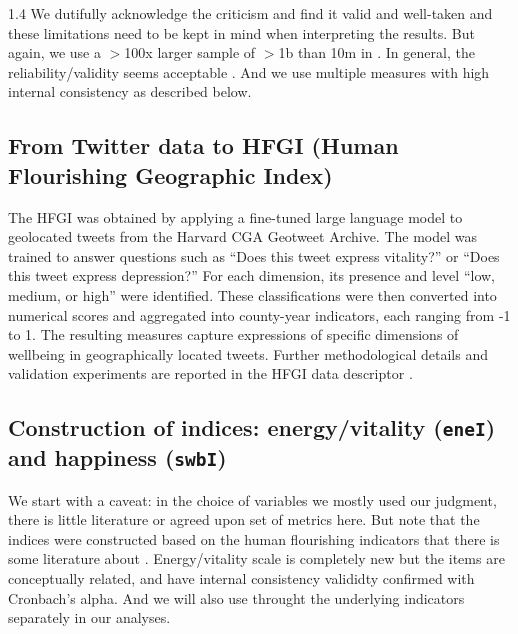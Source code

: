 \documentclass[10pt, letterpaper]{article}
\begin{document}
\begin{spacing}{1.4}
 We dutifully acknowledge the criticism and find it valid and well-taken and
these limitations need to be kept in mind when interpreting the results. But
again, we use a $>$100x larger sample of $>$1b than 10m in \citet{mitchell13}. 
In general, the reliability/validity seems acceptable%
. And we use multiple measures with high internal
consistency as described below.


\subsection{From Twitter data to HFGI (Human Flourishing Geographic Index)}

The HFGI was obtained by applying a fine-tuned large language model to
geolocated tweets from the Harvard CGA Geotweet Archive. The model was trained
to answer questions such as ``Does this tweet express vitality?'' or ``Does this
tweet express depression?'' For each dimension, its presence and level ``low,
medium, or high'' were identified. These classifications were then converted into numerical scores and aggregated into county-year indicators, each ranging from -1 to 1. The resulting measures capture expressions of specific dimensions of wellbeing in geographically located tweets. Further methodological details and validation experiments are reported in the HFGI data descriptor \citep{iacus25b}. 

\subsection{Construction of indices: energy/vitality (\texttt{eneI}) and happiness (\texttt{swbI})}

We start with a caveat: in the choice of variables we mostly used our
judgment, there is little literature or agreed upon set of metrics
here. But note that the indices were constructed based on the  human
flourishing indicators that there is some literature about \citep{iacus25b,iacus15,curini14}.
Energy/vitality scale is completely new but the items are conceptually
related, and have internal consistency valididty confirmed with Cronbach's alpha.
 And we will also use throught the underlying indicators separately in our
 analyses. 


\end{spacing}
\end{document}
